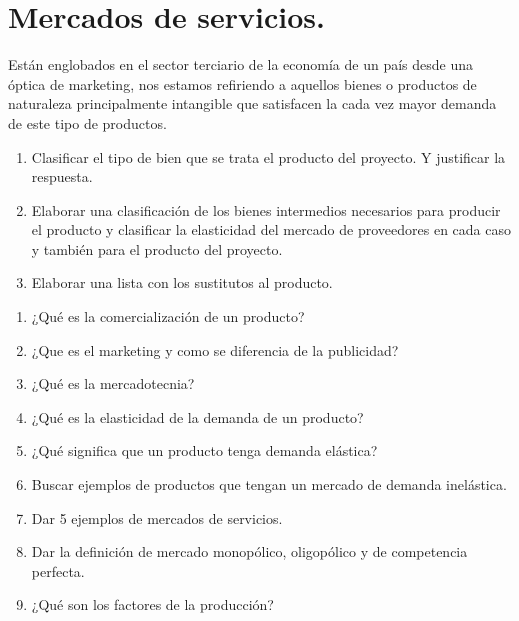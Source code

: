 \documentclass[../main]{subfiles}
\begin{document}
\section{Mercados de servicios.}
Están englobados en el sector terciario de la economía de un país
desde una óptica de marketing, nos estamos refiriendo a aquellos
bienes o productos de naturaleza principalmente intangible que
satisfacen la cada vez mayor demanda de este tipo de productos.
\begin{enumerate}
  \item Clasificar el tipo de bien que se trata el producto del
    proyecto. Y justificar la respuesta.
  \item Elaborar una clasificación de los bienes intermedios
    necesarios para producir el producto y clasificar la elasticidad
    del mercado de proveedores en cada caso y también para el
    producto del proyecto.
  \item Elaborar una lista con los sustitutos al producto.
\end{enumerate}
\begin{enumerate}
  \item ¿Qué es la comercialización de un producto?
  \item ¿Que es el marketing y como se diferencia de la publicidad?
  \item ¿Qué es la mercadotecnia?
  \item ¿Qué es la elasticidad de la demanda de un producto?
  \item ¿Qué significa que un producto tenga demanda elástica?
  \item Buscar ejemplos de productos que tengan un mercado de demanda
    inelástica.
  \item Dar 5 ejemplos de mercados de servicios.
  \item Dar la definición de mercado monopólico, oligopólico y de
    competencia perfecta.
  \item ¿Qué son los factores de la producción?
\end{enumerate}
\end{document}
